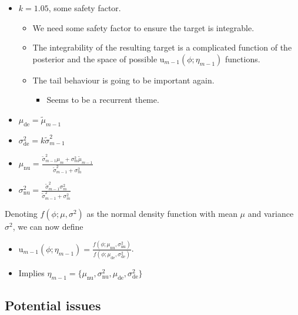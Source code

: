 \documentclass[10pt,a4paper,]{article}
\providecommand{\tightlist}{%
  \setlength{\itemsep}{0pt}\setlength{\parskip}{0pt}}
\newcommand{\tarw}{\text{u}}
\newcommand{\modelindex}{m}
\begin{document}
\begin{itemize}
\item
  \(k = 1.05\), some safety factor.

  \begin{itemize}
  \tightlist
  \item
    We need some safety factor to ensure the target is integrable.
  \item
    The integrability of the resulting target is a complicated function
    of the posterior and the space of possible
    \(\tarw_{\modelindex - 1}(\phi; \eta_{\modelindex - 1})\) functions.
  \item
    The tail behaviour is going to be important again.

    \begin{itemize}
    \tightlist
    \item
      Seems to be a recurrent theme.
    \end{itemize}
  \end{itemize}
\item
  \(\mu_{\text{de}} = \tilde{\mu}_{\modelindex - 1}\)
\item
  \(\sigma^{2}_{\text{de}} = k \tilde{\sigma}^{2}_{\modelindex - 1}\)
\item
  \(\mu_{\text{nu}} = \frac{\tilde{\sigma}^{2}_{\modelindex - 1} \mu_{\modelindex} + \sigma^{2}_{\modelindex}\tilde{\mu}_{\modelindex - 1}} {\tilde{\sigma}^{2}_{\modelindex - 1} + \sigma^{2}_{\modelindex}}\)
\item
  \(\sigma^{2}_{\text{nu}} = \frac{\tilde{\sigma}^{2}_{\modelindex - 1} \sigma^{2}_{\modelindex}}{\tilde{\sigma}^{2}_{\modelindex - 1} + \sigma^{2}_{\modelindex}}\)
\end{itemize}

Denoting \(f(\phi; \mu, \sigma^2)\) as the normal density function with
mean \(\mu\) and variance \(\sigma^2\), we can now define

\begin{itemize}
\tightlist
\item
  \(\tarw_{\modelindex - 1}(\phi; \eta_{\modelindex - 1}) = \frac{f(\phi; \mu_{\text{nu}}, \sigma^2_{\text{nu}})} {f(\phi; \mu_{\text{de}}, \sigma^2_{\text{de}})}\).
\item
  Implies
  \(\eta_{\modelindex - 1} = \{\mu_{\text{nu}}, \sigma^{2}_{\text{nu}}, \mu_{\text{de}}, \sigma^{2}_{\text{de}}\}\)
\end{itemize}

\subsection{Potential issues}\label{potential-issues}
\end{document}

